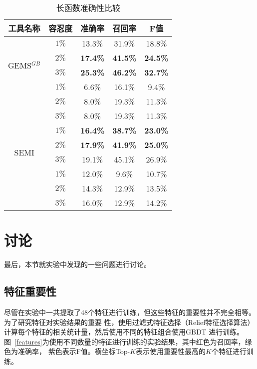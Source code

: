 \begin{table}[!t]
\zihaowu
  \renewcommand{\arraystretch}{1.3}
  \caption{长函数准确性比较}
  \label{long_methods}
  \centering
  \begin{tabular}{cc|ccc}
  \toprule
   工具名称 &容忍度 &准确率 &召回率 &F值\\ 
  \midrule
  \multirow{4}{*}{GEMS$^{GB}$}&$1\%$ &13.3\% &31.9\% &18.8\% \\ 
  &$2\%$ &\bf{17.4\%} &\bf{41.5\%} &\bf{24.5\%} \\ 
  &$3\%$ &\bf{25.3\%} &\bf{46.2\%} &\bf{32.7\%} \\ 
  \hline
  \multirow{4}{*}{JExtract}&$1\%$ &6.6\% &16.1\% &9.4\% \\ 
  &$2\%$ &8.0\% &19.3\% &11.3\% \\ 
  &$3\%$ &8.0\% &19.3\% &11.3\% \\ 
  \hline
  \multirow{4}{*}{SEMI}&$1\%$ &\bf{16.4\%} &\bf{38.7\%} &\bf{23.0\%} \\ 
  &$2\%$ &\bf{17.9\%} &\bf{41.9\%} &\bf{25.0\%} \\ 
  &$3\%$ &19.1\% &45.1\% &26.9\% \\ 
  \hline
  \multirow{4}{*}{JDeodorant}&$1\%$ &12.0\% &9.6\% &10.7\% \\
  &$2\%$ &14.3\% &12.9\% &13.5\% \\ 
  &$3\%$ &16.0\% &12.9\% &14.2\% \\ 
  \bottomrule
  \end{tabular}
  \end{table}
  
\section{讨论}\label{discuss}
最后，本节就实验中发现的一些问题进行讨论。

\subsection{特征重要性}

尽管在实验中一共提取了48个特征进行训练，但这些特征的重要性并不完全相等。为了研究特征对实验结果的重要
性，使用过滤式特征选择（Relief特征选择算法）计算每个特征的相关统计量，然后使用不同的特征组合使用GBDT
进行训练。图~\ref{features}为使用不同数量的特征进行训练的实验结果，其中红色为召回率，绿色为准确率，
紫色表示F值。横坐标Top-$K$表示使用重要性最高的$K$个特征进行训练。

